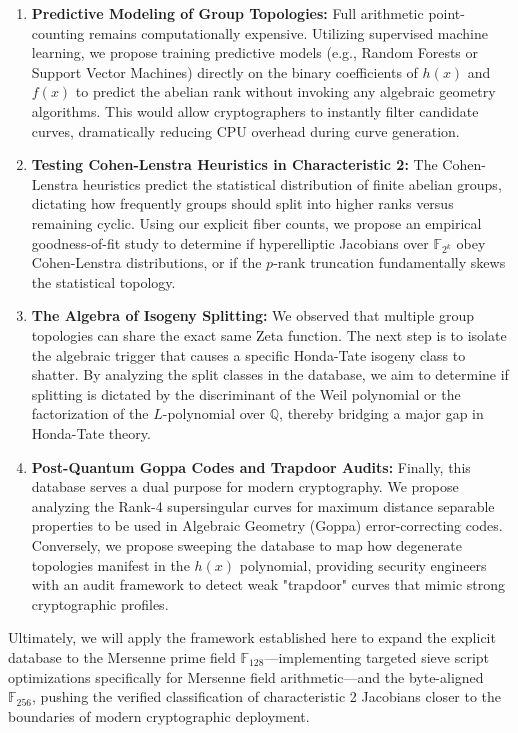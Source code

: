 \documentclass[letterpaper, 11pt]{article}
\begin{document}
\begin{enumerate}
    \item \textbf{Predictive Modeling of Group Topologies:} Full arithmetic point-counting remains computationally expensive. Utilizing supervised machine learning, we propose training predictive models (e.g., Random Forests or Support Vector Machines) directly on the binary coefficients of $h(x)$ and $f(x)$ to predict the abelian rank without invoking any algebraic geometry algorithms. This would allow cryptographers to instantly filter candidate curves, dramatically reducing CPU overhead during curve generation.
    \item \textbf{Testing Cohen-Lenstra Heuristics in Characteristic 2:} The Cohen-Lenstra heuristics predict the statistical distribution of finite abelian groups, dictating how frequently groups should split into higher ranks versus remaining cyclic. Using our explicit fiber counts, we propose an empirical goodness-of-fit study to determine if hyperelliptic Jacobians over $\mathbb{F}_{2^k}$ obey Cohen-Lenstra distributions, or if the $p$-rank truncation fundamentally skews the statistical topology.
    \item \textbf{The Algebra of Isogeny Splitting:} We observed that multiple group topologies can share the exact same Zeta function. The next step is to isolate the algebraic trigger that causes a specific Honda-Tate isogeny class to shatter. By analyzing the split classes in the database, we aim to determine if splitting is dictated by the discriminant of the Weil polynomial or the factorization of the $L$-polynomial over $\mathbb{Q}$, thereby bridging a major gap in Honda-Tate theory.
    \item \textbf{Post-Quantum Goppa Codes and Trapdoor Audits:} Finally, this database serves a dual purpose for modern cryptography. We propose analyzing the Rank-4 supersingular curves for maximum distance separable properties to be used in Algebraic Geometry (Goppa) error-correcting codes. Conversely, we propose sweeping the database to map how degenerate topologies manifest in the $h(x)$ polynomial, providing security engineers with an audit framework to detect weak "trapdoor" curves that mimic strong cryptographic profiles.
\end{enumerate}

Ultimately, we will apply the framework established here to expand the explicit database to the Mersenne prime field $\mathbb{F}_{128}$—implementing targeted sieve script optimizations specifically for Mersenne field arithmetic—and the byte-aligned $\mathbb{F}_{256}$, pushing the verified classification of characteristic 2 Jacobians closer to the boundaries of modern cryptographic deployment.
\end{document}
